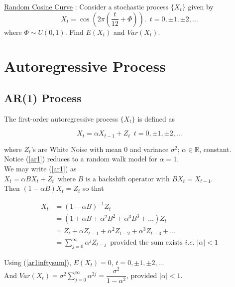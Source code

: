 \documentclass[11pt, a4paper]{article}
\begin{document}
\bclampe \hspace{0.1cm} \underline{Random Cosine Curve} : Consider a stochastic process $\{X_t\}$ given by $$X_t = \cos \left( 2\pi \left( \dfrac{t}{12} + \Phi \right) \right). \,\,\, t = 0, \pm 1, \pm 2, \ldots$$
where $\Phi \sim U(0, 1)$. Find $E(X_t)$ and $Var(X_t)$.

\section{Autoregressive Process}

\subsection{AR(1) Process}

The first-order autoregressive process $\{X_t\}$ is defined as

\begin{equation}\label{ar1}
X_t = \alpha X_{t-1} + Z_t \,\,\, t = 0, \pm 1, \pm 2, \ldots
\end{equation}

where $Z_t$'s are White Noise with mean $0$ and variance $\sigma^2$; $\alpha \in \mathbb{R}$, constant. \\

Notice (\ref{ar1}) reduces to a random walk model for $\alpha = 1$. \\

We may write (\ref{ar1}) as $X_t = \alpha BX_{t} + Z_t \,\,\, \text{where } B \text{ is a backshift operator with } BX_t = X_{t-1}$. \\

Then $(1 - \alpha B) X_t = Z_t$ so that

\begin{align}\label{ar1inftysum}
X_t &= (1 - \alpha B)^{-1} Z_t \nonumber \\
&= (1 + \alpha B + \alpha^2 B^2 + \alpha^3 B^3 + \ldots) Z_t \nonumber \\
&= Z_t + \alpha Z_{t-1} + \alpha^2 Z_{t-2} + \alpha^3 Z_{t-3} + \ldots \nonumber \\
&= \sum \limits_{j = 0}^{\infty} \alpha^j Z_{t-j} \,\,\, \text{provided the sum exists } i.e. \,\, |\alpha| < 1
\end{align}

Using (\ref{ar1inftysum}), $E(X_t) = 0$, $t = 0, \pm 1, \pm 2, \ldots$ \\

And $Var(X_t) = \sigma^2 \sum \limits_{j = 0}^{\infty} \alpha^{2j} = \dfrac{\sigma^2}{1 - \alpha^2}$, provided $|\alpha| < 1$. \\
\end{document}
